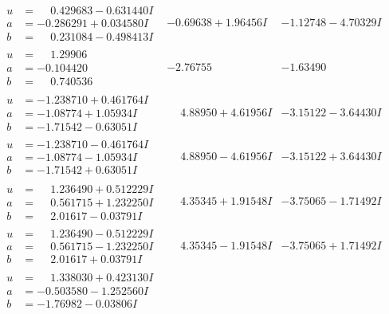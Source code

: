 \documentclass[1p]{elsarticle_modified}
\theoremstyle{definition}
\begin{document}
$$\begin{array}{c|c|c}
\begin{aligned}
u &= \phantom{-}0.429683 - 0.631440 I \\
a &= -0.286291 + 0.034580 I \\
b &= \phantom{-}0.231084 - 0.498413 I\end{aligned}
 & -0.69638 + 1.96456 I & -1.12748 - 4.70329 I \\ \hline\begin{aligned}
u &= \phantom{-}1.29906\phantom{ +0.000000I} \\
a &= -0.104420\phantom{ +0.000000I} \\
b &= \phantom{-}0.740536\phantom{ +0.000000I}\end{aligned}
 & -2.76755\phantom{ +0.000000I} & -1.63490\phantom{ +0.000000I} \\ \hline\begin{aligned}
u &= -1.238710 + 0.461764 I \\
a &= -1.08774 + 1.05934 I \\
b &= -1.71542 - 0.63051 I\end{aligned}
 & \phantom{-}4.88950 + 4.61956 I & -3.15122 - 3.64430 I \\ \hline\begin{aligned}
u &= -1.238710 - 0.461764 I \\
a &= -1.08774 - 1.05934 I \\
b &= -1.71542 + 0.63051 I\end{aligned}
 & \phantom{-}4.88950 - 4.61956 I & -3.15122 + 3.64430 I \\ \hline\begin{aligned}
u &= \phantom{-}1.236490 + 0.512229 I \\
a &= \phantom{-}0.561715 + 1.232250 I \\
b &= \phantom{-}2.01617 - 0.03791 I\end{aligned}
 & \phantom{-}4.35345 + 1.91548 I & -3.75065 - 1.71492 I \\ \hline\begin{aligned}
u &= \phantom{-}1.236490 - 0.512229 I \\
a &= \phantom{-}0.561715 - 1.232250 I \\
b &= \phantom{-}2.01617 + 0.03791 I\end{aligned}
 & \phantom{-}4.35345 - 1.91548 I & -3.75065 + 1.71492 I \\ \hline\begin{aligned}
u &= \phantom{-}1.338030 + 0.423130 I \\
a &= -0.503580 - 1.252560 I \\
b &= -1.76982 - 0.03806 I\end{aligned}

\end{array}$$
\end{document}
